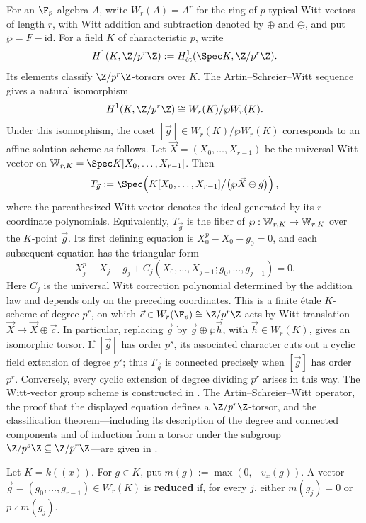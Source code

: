 For an $\F_p$-algebra $A$, write $W_r(A)=A^r$ for the ring of $p$-typical
Witt vectors of length $r$, with Witt addition and subtraction denoted by
$\oplus$ and $\ominus$, and put $\wp=F-\mathrm{id}$. For a field $K$ of
characteristic $p$, write
\[
H^1(K,\Z/p^r\Z):=
H^1_{\mathrm{\acute et}}(\Spec K,\Z/p^r\Z).
\]
Its elements classify $\Z/p^r\Z$-torsors over $K$.
The Artin--Schreier--Witt sequence gives a natural isomorphism
\[
H^1(K,\Z/p^r\Z)\cong W_r(K)/\wp W_r(K).
\]
Under this isomorphism, the coset
$[\vec g]\in W_r(K)/\wp W_r(K)$ corresponds to an affine solution scheme
as follows. Let $\vec X=(X_0,\dots,X_{r-1})$ be the universal Witt vector
on $\bW_{r,K}=\Spec K[X_0,\dots,X_{r-1}]$. Then
\[
T_{\vec g}:=
\Spec\!\left(
K[X_0,\dots,X_{r-1}]
\big/\bigl(\wp\vec X\ominus\vec g\bigr)
\right),
\]
where the parenthesized Witt vector denotes the ideal generated by its $r$
coordinate polynomials. Equivalently, $T_{\vec g}$ is the fiber of
$\wp:\mathbb{W}_{r,K}\to\mathbb{W}_{r,K}$ over the $K$-point $\vec g$. Its first defining
equation is $X_0^p-X_0-g_0=0$, and each subsequent equation has the
triangular form
\[
X_j^p-X_j-g_j+
C_j(X_0,\dots,X_{j-1};g_0,\dots,g_{j-1})=0.
\]
Here $C_j$ is the universal Witt correction polynomial determined by the
addition law and depends only on the preceding coordinates. This is a finite
\'etale $K$-scheme of degree $p^r$, on which
$\vec c\in W_r(\F_p)\cong\Z/p^r\Z$ acts by Witt translation
$\vec X\mapsto\vec X\oplus\vec c$. In particular, replacing $\vec g$ by
$\vec g\oplus\wp\vec h$, with $\vec h\in W_r(K)$, gives an isomorphic
torsor. If $[\vec g]$ has order $p^s$, its associated character cuts out a
cyclic field extension of degree $p^s$; thus $T_{\vec g}$ is connected
precisely when $[\vec g]$ has order $p^r$. Conversely, every cyclic
extension of degree dividing $p^r$ arises in this way.
The Witt-vector group scheme is constructed in
. The Artin--Schreier--Witt
operator, the proof that the displayed equation defines a
$\Z/p^r\Z$-torsor, and the classification theorem---including its description
of the degree and connected components and of induction from a torsor under the
subgroup $\Z/p^s\Z\subseteq\Z/p^r\Z$---are given in
.

\begin{definition}\label{definition:reduced_witt_vector}
Let $K=k((x))$. For $g\in K$, put
$m(g):=\max(0,-v_x(g))$. A vector
$\vec g=(g_0,\dots,g_{r-1})\in W_r(K)$ is \textbf{reduced} if, for every
$j$, either $m(g_j)=0$ or $p\nmid m(g_j)$.
\end{definition}

